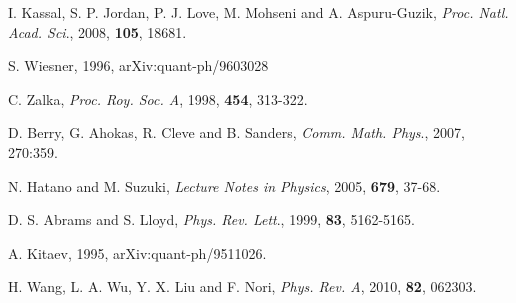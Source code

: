 \documentclass[8.5pt,twoside,twocolumn]{article}
\begin{document}
\begin{thebibliography}{99}
I. Kassal, S. P. Jordan, P. J. Love, M. Mohseni and A. Aspuru-Guzik, \emph{Proc. Natl. Acad. Sci}., 2008, \textbf{105}, 18681.

S. Wiesner, 1996, arXiv:quant-ph/9603028

C. Zalka, \emph{Proc. Roy. Soc. A}, 1998, \textbf{454}, 313-322.










D. Berry, G. Ahokas, R. Cleve and B. Sanders, \emph{Comm. Math. Phys}., 2007, 270:359.

N. Hatano and M. Suzuki, \emph{Lecture Notes in Physics}, 2005, \textbf{679}, 37-68.

D. S. Abrams and S. Lloyd, \emph{Phys. Rev. Lett}., 1999, \textbf{83}, 5162-5165.

A. Kitaev, 1995, arXiv:quant-ph/9511026.

H. Wang, L. A. Wu, Y. X. Liu and F. Nori, \emph{Phys. Rev. A}, 2010, \textbf{82}, 062303.


\end{thebibliography}
\end{document}
